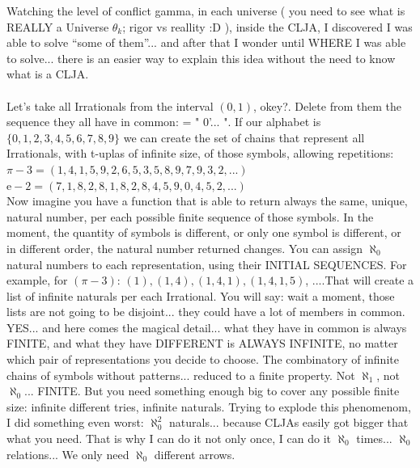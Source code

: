 		\noindent
		Watching the level of conflict gamma, in each universe ( you need to see what is REALLY a Universe $\theta_{k}$; rigor vs reallity :D ), inside the CLJA, I discovered I was able to solve ``some of them''... and after that I wonder until WHERE I was able to solve... there is an easier way to explain this idea without the need to know what is a CLJA.
		\\\\
		
		\noindent
		Let's take all Irrationals from the interval $(0,1)$, okey?. Delete from them the sequence they all have in common: = "  0'... ". If our alphabet is $\{0,1,2,3,4,5,6,7,8,9\}$ we can create the set of chains that represent all Irrationals, with t-uplas of infinite size, of those symbols, allowing repetitions:\\
		$\pi-3 =         (1, 4, 1, 5, 9, 2, 6, 5, 3, 5, 8, 9, 7, 9, 3, 2, ...)$\\
		$\mathrm{e}-2 =  (7, 1, 8, 2, 8, 1, 8, 2, 8, 4, 5, 9, 0, 4, 5, 2, ...)$\\
		Now imagine you have a function that is able to return always the same, unique, natural number, per each possible finite sequence of those symbols. In the moment, the quantity of symbols is different, or only one symbol is different, or in different order, the natural number returned changes. You can assign $\aleph_{0}$ natural numbers to each representation, using their INITIAL SEQUENCES. For example, for $(\pi-3)$: $(1), (1,4), (1, 4, 1), (1, 4, 1, 5)$, ....That will create a list of infinite naturals per each Irrational. You will say: wait a moment, those lists are not going to be disjoint... they could have a lot of members in common. YES... and here comes the magical detail... what they have in common is always FINITE, and what they have DIFFERENT is ALWAYS INFINITE, no matter which pair of representations you decide to choose. The combinatory of infinite chains of symbols without patterns... reduced to a finite property. Not $\aleph_{1}$, not $\aleph_{0}$... FINITE. But you need something enough big to cover any possible finite size: infinite different tries, infinite naturals. Trying to explode this phenomenom, I did something even worst: $\aleph_{0}^{2}$ naturals... because CLJAs easily got bigger that what you need. That is why I can do it not only once, I can do it $\aleph_{0}$ times... $\aleph_{0}$ relations... We only need $\aleph_{0}$ different arrows.
		\\\\
		
